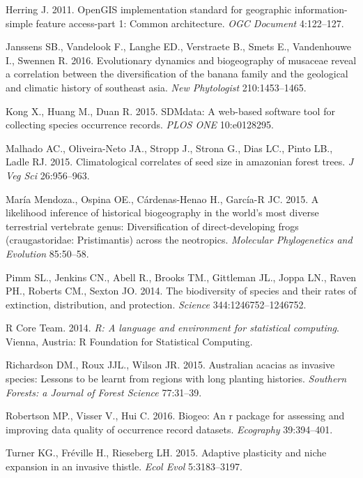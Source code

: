\documentclass[author-year, review, 11pt]{components/elsarticle} %
\begin{document}
\hypertarget{ref-wkt}{}
Herring J. 2011. OpenGIS implementation standard for geographic
information-simple feature access-part 1: Common architecture. \emph{OGC
Document} 4:122--127.

\hypertarget{ref-Janssens_2016}{}
Janssens SB., Vandelook F., Langhe ED., Verstraete B., Smets E.,
Vandenhouwe I., Swennen R. 2016. Evolutionary dynamics and biogeography
of musaceae reveal a correlation between the diversification of the
banana family and the geological and climatic history of southeast asia.
\emph{New Phytologist} 210:1453--1465.

\hypertarget{ref-Kong_2015}{}
Kong X., Huang M., Duan R. 2015. SDMdata: A web-based software tool for
collecting species occurrence records. \emph{PLOS ONE} 10:e0128295.

\hypertarget{ref-Malhado_2015}{}
Malhado AC., Oliveira-Neto JA., Stropp J., Strona G., Dias LC., Pinto
LB., Ladle RJ. 2015. Climatological correlates of seed size in amazonian
forest trees. \emph{J Veg Sci} 26:956--963.

\hypertarget{ref-Mendoza_2015}{}
María Mendoza., Ospina OE., Cárdenas-Henao H., García-R JC. 2015. A
likelihood inference of historical biogeography in the world's most
diverse terrestrial vertebrate genus: Diversification of
direct-developing frogs (craugastoridae: Pristimantis) across the
neotropics. \emph{Molecular Phylogenetics and Evolution} 85:50--58.

\hypertarget{ref-Pimm_2014}{}
Pimm SL., Jenkins CN., Abell R., Brooks TM., Gittleman JL., Joppa LN.,
Raven PH., Roberts CM., Sexton JO. 2014. The biodiversity of species and
their rates of extinction, distribution, and protection. \emph{Science}
344:1246752--1246752.

\hypertarget{ref-R}{}
R Core Team. 2014. \emph{R: A language and environment for statistical
computing}. Vienna, Austria: R Foundation for Statistical Computing.

\hypertarget{ref-Richardson_2015}{}
Richardson DM., Roux JJL., Wilson JR. 2015. Australian acacias as
invasive species: Lessons to be learnt from regions with long planting
histories. \emph{Southern Forests: a Journal of Forest Science}
77:31--39.

\hypertarget{ref-Robertson_2016}{}
Robertson MP., Visser V., Hui C. 2016. Biogeo: An r package for
assessing and improving data quality of occurrence record datasets.
\emph{Ecography} 39:394--401.

\hypertarget{ref-Turner_2015}{}
Turner KG., Fréville H., Rieseberg LH. 2015. Adaptive plasticity and
niche expansion in an invasive thistle. \emph{Ecol Evol} 5:3183--3197.
\end{document}
